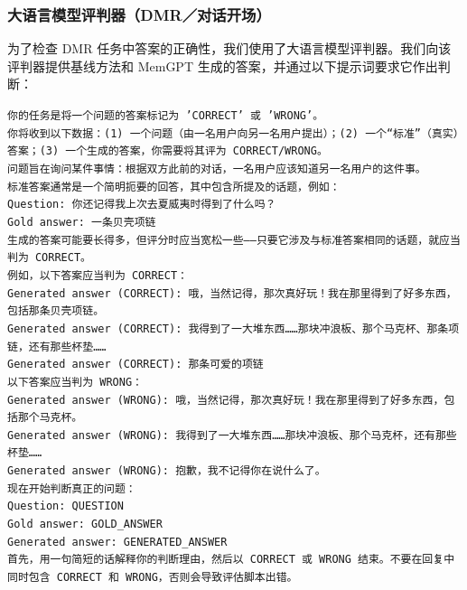 \documentclass[UTF8,fontset=fandol,a4paper,11pt]{ctexart}
\newcommand{\ours}{MemGPT\xspace}
\begin{document}
\subsubsection{大语言模型评判器（DMR／对话开场）}
为了检查 DMR 任务中答案的正确性，我们使用了大语言模型评判器。我们向该评判器提供基线方法和 \ours 生成的答案，并通过以下提示词要求它作出判断：
\begin{mdframed}
\small
\texttt{你的任务是将一个问题的答案标记为 'CORRECT' 或 'WRONG'。\\
你将收到以下数据：(1) 一个问题（由一名用户向另一名用户提出）；(2) 一个“标准”（真实）答案；(3) 一个生成的答案，你需要将其评为 CORRECT/WRONG。\\
问题旨在询问某件事情：根据双方此前的对话，一名用户应该知道另一名用户的这件事。\\
标准答案通常是一个简明扼要的回答，其中包含所提及的话题，例如：\\
Question: 你还记得我上次去夏威夷时得到了什么吗？\\
Gold answer: 一条贝壳项链\\
生成的答案可能要长得多，但评分时应当宽松一些——只要它涉及与标准答案相同的话题，就应当判为 CORRECT。\\
例如，以下答案应当判为 CORRECT：\\
Generated answer (CORRECT): 哦，当然记得，那次真好玩！我在那里得到了好多东西，包括那条贝壳项链。\\
Generated answer (CORRECT): 我得到了一大堆东西……那块冲浪板、那个马克杯、那条项链，还有那些杯垫……\\
Generated answer (CORRECT): 那条可爱的项链\\
以下答案应当判为 WRONG：\\
Generated answer (WRONG): 哦，当然记得，那次真好玩！我在那里得到了好多东西，包括那个马克杯。\\
Generated answer (WRONG): 我得到了一大堆东西……那块冲浪板、那个马克杯，还有那些杯垫……\\
Generated answer (WRONG): 抱歉，我不记得你在说什么了。\\
现在开始判断真正的问题：\\
Question: QUESTION\\
Gold answer: GOLD\_ANSWER\\
Generated answer: GENERATED\_ANSWER\\
首先，用一句简短的话解释你的判断理由，然后以 CORRECT 或 WRONG 结束。不要在回复中同时包含 CORRECT 和 WRONG，否则会导致评估脚本出错。}
\end{mdframed}
\end{document}
